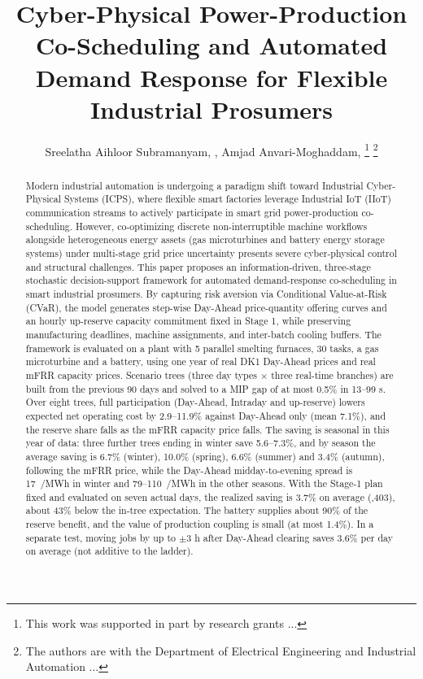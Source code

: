 \documentclass[journal]{IEEEtran}
\begin{document}
\title{Cyber-Physical Power-Production Co-Scheduling and Automated Demand Response for Flexible Industrial Prosumers}

\author{Sreelatha Aihloor Subramanyam, , Amjad Anvari-Moghaddam, 
\thanks{This work was supported in part by research grants ...}
\thanks{The authors are with the Department of Electrical Engineering and Industrial Automation ...}
}

\maketitle

\begin{abstract}
Modern industrial automation is undergoing a paradigm shift toward Industrial Cyber-Physical Systems (ICPS), where flexible smart factories leverage Industrial IoT (IIoT) communication streams to actively participate in smart grid power-production co-scheduling. However, co-optimizing discrete non-interruptible machine workflows alongside heterogeneous energy assets (gas microturbines and battery energy storage systems) under multi-stage grid price uncertainty presents severe cyber-physical control and structural challenges. This paper proposes an information-driven, three-stage stochastic decision-support framework for automated demand-response co-scheduling in smart industrial prosumers. By capturing risk aversion via Conditional Value-at-Risk (CVaR), the model generates step-wise Day-Ahead price-quantity offering curves and an hourly up-reserve capacity commitment fixed in Stage 1, while preserving manufacturing deadlines, machine assignments, and inter-batch cooling buffers. The framework is evaluated on a plant with 5 parallel smelting furnaces, 30 tasks, a gas microturbine and a battery, using one year of real DK1 Day-Ahead prices and real mFRR capacity prices. Scenario trees (three day types $\times$ three real-time branches) are built from the previous 90 days and solved to a MIP gap of at most 0.5\% in 13--99 s. Over eight trees, full participation (Day-Ahead, Intraday and up-reserve) lowers expected net operating cost by 2.9--11.9\% against Day-Ahead only (mean 7.1\%), and the reserve share falls as the mFRR capacity price falls. The saving is seasonal in this year of data: three further trees ending in winter save 5.6--7.3\%, and by season the average saving is 6.7\% (winter), 10.0\% (spring), 6.6\% (summer) and 3.4\% (autumn), following the mFRR price, while the Day-Ahead midday-to-evening spread is 17~\texteuro/MWh in winter and 79--110~\texteuro/MWh in the other seasons. With the Stage-1 plan fixed and evaluated on seven actual days, the realized saving is 3.7\% on average (,403), about 43\% below the in-tree expectation. The battery supplies about 90\% of the reserve benefit, and the value of production coupling is small (at most 1.4\%). In a separate test, moving jobs by up to $\pm3$ h after Day-Ahead clearing saves 3.6\% per day on average (not additive to the ladder).
\end{abstract}
\end{document}
